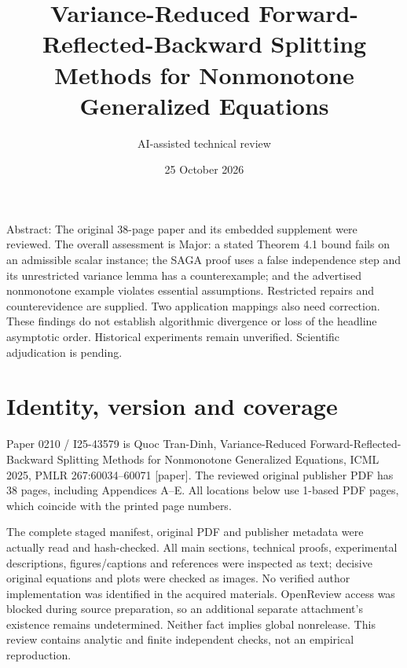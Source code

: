 \documentclass[10pt]{article}
\title{Variance-Reduced Forward-Reflected-Backward Splitting Methods for Nonmonotone Generalized Equations}
\author{AI-assisted technical review}
\date{25 October 2026}
\begin{document}
\maketitle
Abstract: The original 38-page paper and its embedded supplement were reviewed. The overall assessment is Major: a stated Theorem 4.1 bound fails on an admissible scalar instance; the SAGA proof uses a false independence step and its unrestricted variance lemma has a counterexample; and the advertised nonmonotone example violates essential assumptions. Restricted repairs and counterevidence are supplied. Two application mappings also need correction. These findings do not establish algorithmic divergence or loss of the headline asymptotic order. Historical experiments remain unverified. Scientific adjudication is pending.\par
\section*{Identity, version and coverage}
Paper 0210 / I25-43579 is Quoc Tran-Dinh, Variance-Reduced Forward-Reflected-Backward Splitting Methods for Nonmonotone Generalized Equations, ICML 2025, PMLR 267:60034–60071 [paper]. The reviewed original publisher PDF has 38 pages, including Appendices A–E. All locations below use 1-based PDF pages, which coincide with the printed page numbers.\par
The complete staged manifest, original PDF and publisher metadata were actually read and hash-checked. All main sections, technical proofs, experimental descriptions, figures/captions and references were inspected as text; decisive original equations and plots were checked as images. No verified author implementation was identified in the acquired materials. OpenReview access was blocked during source preparation, so an additional separate attachment’s existence remains undetermined. Neither fact implies global nonrelease. This review contains analytic and finite independent checks, not an empirical reproduction.\par
\end{document}
